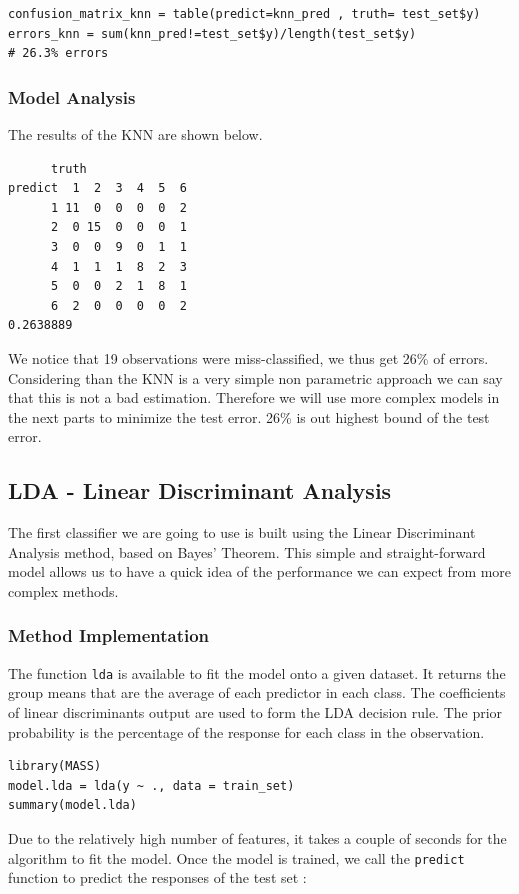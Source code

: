 \documentclass[]{report}
\begin{document}
\begin{lstlisting}
confusion_matrix_knn = table(predict=knn_pred , truth= test_set$y)
errors_knn = sum(knn_pred!=test_set$y)/length(test_set$y)
# 26.3% errors
\end{lstlisting}

\subsubsection{Model Analysis}
The results of the KNN are shown below.
\begin{verbatim}
      truth
predict  1  2  3  4  5  6
      1 11  0  0  0  0  2
      2  0 15  0  0  0  1
      3  0  0  9  0  1  1
      4  1  1  1  8  2  3
      5  0  0  2  1  8  1
      6  2  0  0  0  0  2
0.2638889
\end{verbatim}
We notice that 19 observations were miss-classified, we thus get 26\% of errors. Considering than the KNN is a very simple non parametric approach we can say that this is not a bad estimation. Therefore we will use more complex models in the next parts to minimize the test error. 26\% is out highest bound of the test error.

\pagebreak

\subsection{LDA - Linear Discriminant Analysis}
The first classifier we are going to use is built using the Linear Discriminant Analysis method, based on Bayes' Theorem. This simple and straight-forward model allows us to have a quick idea of the performance we can expect from more complex methods.  

\subsubsection{Method Implementation}
The function \texttt{lda} is available to fit the model onto a given dataset. It returns the group means that are the average of each predictor in each class. The coefficients of linear discriminants output are used to form the LDA decision rule. The prior probability is the percentage of the response for each class in the observation.

\begin{lstlisting}
library(MASS)
model.lda = lda(y ~ ., data = train_set)
summary(model.lda)
\end{lstlisting}

Due to the relatively high number of features, it takes a couple of seconds for the algorithm to fit the model.  Once the model is trained, we call the \texttt{predict} function to predict the responses of the test set : 
\end{document}
